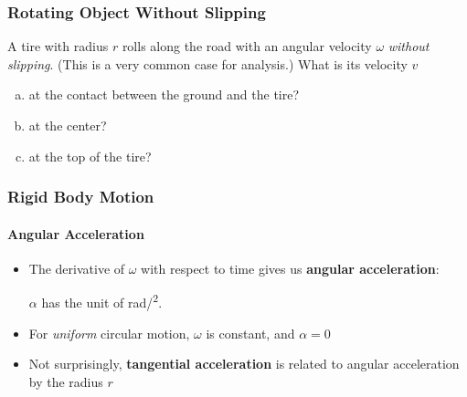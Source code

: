 \documentclass[12pt,compress,aspectratio=169]{beamer}
\begin{document}
\begin{frame}
  \frametitle{Rotating Object Without Slipping}
  A tire with radius $r$ rolls along the road with an angular velocity $\omega$
  \emph{without slipping}. (This is a very common case for analysis.)  What
  is its velocity $v$
  \begin{enumerate}[a.]
  \item at the contact between the ground and the tire?
  \item at the center?
  \item at the top of the tire?
  \end{enumerate}
  \vspace{-0.4in}
  \begin{center}
    \hspace{1in}
  \end{center}
\end{frame}

\begin{frame}
  \frametitle{Rigid Body Motion}
  \framesubtitle{Angular Acceleration}
  \begin{itemize}
  \item The derivative of $\omega$ with respect to time gives us
    \textbf{angular acceleration}:


    \vspace{-0.1in}$\alpha$ has the unit of \si{rad/\sec^2}.

  \item For \emph{uniform} circular motion, $\omega$ is constant, and $\alpha=0$
  \item Not surprisingly, \textbf{tangential acceleration} is related to
    angular acceleration by the radius $r$
    

  \end{itemize}
\end{frame}
\end{document}
